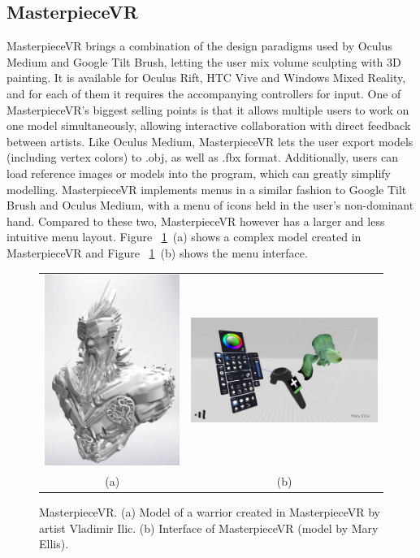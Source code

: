 \subsection{MasterpieceVR}
MasterpieceVR brings a combination of the design paradigms used by Oculus Medium and Google Tilt Brush, letting the user mix volume sculpting with 3D painting. It is available for Oculus Rift, HTC Vive and Windows Mixed Reality, and for each of them it requires the accompanying controllers for input. One of MasterpieceVR's biggest selling points is that it allows multiple users to work on one model simultaneously, allowing interactive collaboration with direct feedback between artists. Like Oculus Medium, MasterpieceVR lets the user export models (including vertex colors) to .obj, as well as .fbx format. Additionally, users can load reference images or models into the program, which can greatly simplify modelling. MasterpieceVR implements menus in a similar fashion to Google Tilt Brush and Oculus Medium, with a menu of icons held in the user's non-dominant hand. Compared to these two, MasterpieceVR however has a larger and less intuitive menu layout. Figure ~\ref{fig:masterpieceVR}~(a) shows a complex model created in MasterpieceVR and Figure ~\ref{fig:masterpieceVR}~(b) shows the menu interface.

\begin{figure}[!h]
    \centering
    \setlength{\tabcolsep}{0.0130\linewidth}
    \begin{tabular}{@{}cc@{}}
   	\includegraphics[width=0.35\linewidth]{figures/MasterpieceVR_Vladimir_Ilic}&
   	\includegraphics[width=0.5\linewidth]{figures/MasterpieceVR_interface}\\
    (a)&(b)\\
    \end{tabular}
    \caption[MasterpieceVR]{MasterpieceVR.
    	  \textup{(a)} Model of a warrior created in MasterpieceVR by artist Vladimir Ilic.
			  \textup{(b)} Interface of MasterpieceVR (model by Mary Ellis). 
      \label{fig:masterpieceVR}}
\end{figure}

